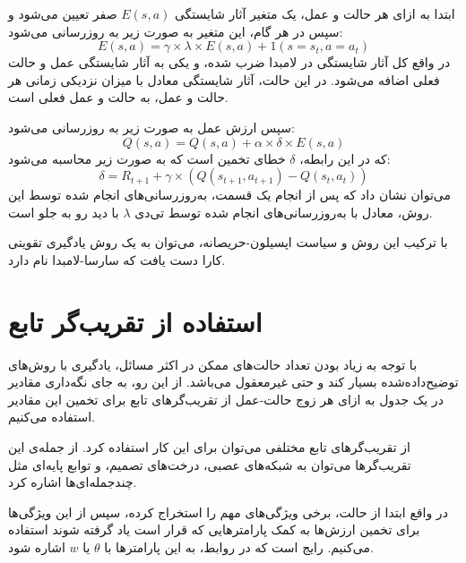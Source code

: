 ابتدا به ازای هر حالت و عمل، یک متغیر آثار شایستگی $E(s, a)$
صفر تعیین می‌شود و سپس در هر گام، این متغیر به صورت زیر به روزرسانی می‌شود:
\begin{equation}\label{eq:eligibility_trace}
    E(s, a) = \gamma \times \lambda \times E(s, a) + 1(s = s_t, a = a_t)
\end{equation}
در واقع کل آثار شایستگی در لامبدا ضرب شده، و یکی به آثار شایستگی عمل و حالت فعلی اضافه می‌شود.
در این حالت، آثار شایستگی معادل با میزان نزدیکی زمانی هر حالت و عمل، به حالت و عمل فعلی است.

سپس ارزش عمل به صورت زیر به روزرسانی می‌شود:
\begin{equation}\label{eq:td_lambda_backward_q_function}
    Q(s, a) = Q(s, a) + \alpha \times \delta \times E(s, a)
\end{equation}
که در این رابطه، $\delta$
خطای تخمین است که به صورت زیر محاسبه می‌شود:
\begin{equation}\label{eq:td_lambda_backward_delta}
    \delta = R_{t+1} + \gamma \times (Q(s_{t+1}, a_{t+1}) - Q(s_t, a_t))
\end{equation}
می‌توان نشان داد که پس از انجام یک قسمت، به‌روز‌رسانی‌های انجام شده توسط این روش، معادل با به‌روز‌رسانی‌های انجام شده توسط تی‌دی $\lambda$ با دید رو به جلو است.

با ترکیب این روش و سیاست اپسیلون-حریصانه، می‌توان به یک روش یادگیری تقویتی کارا دست یافت که 
سارسا-لامبدا  نام دارد.
\section{استفاده از تقریب‌گر تابع}
با توجه به زیاد بودن تعداد حالت‌های ممکن در اکثر مسائل، یادگیری با روش‌های توضیح‌داده‌شده بسیار کند و حتی غیرمعقول می‌باشد.
از این رو، به جای نگه‌داری مقادیر  
در یک جدول به ازای هر زوج حالت-عمل
 از تقریب‌گر‌های تابع
  برای تخمین این مقادیر استفاده می‌کنیم.

    از تقریب‌گر‌های تابع مختلفی می‌توان برای این کار استفاده کرد.
    از جمله‌ی این تقریب‌گر‌ها می‌توان به شبکه‌های عصبی، درخت‌های تصمیم، و توابع پایه‌ای مثل چندجمله‌ای‌ها اشاره کرد.

    در واقع ابتدا از حالت، برخی ویژگی‌های مهم را استخراج کرده، سپس از این ویژگی‌ها برای تخمین ارزش‌ها به کمک پارامتر‌هایی که قرار است یاد گرفته شوند استفاده می‌کنیم.
    رایج است که در روابط، به این پارامتر‌ها با 
    $\theta$ یا $w$
    اشاره شود.

